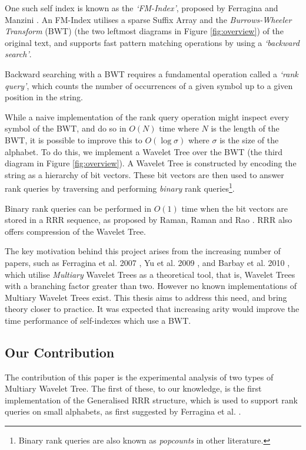 One such self index is known as the \emph{`FM-Index'}, proposed by
Ferragina and Manzini \cite{ferragina2000}. An FM-Index utilises a 
sparse Suffix Array and the \emph{Burrows-Wheeler Transform} (BWT) \cite{burrows1994} (the two leftmost 
diagrams in Figure \ref{fig:overview}) of the original text, and supports fast 
pattern matching operations by using a \emph{`backward search'}.

Backward searching with a BWT requires a fundamental operation called a 
\emph{`rank query'}, which counts the number of occurrences of a given symbol up 
to a given position in the string.

While a naive implementation of the rank query operation might inspect every 
symbol of the BWT, and do so in $O(N)$ time where $N$ is the length of the BWT, 
it is possible to improve this to $O(\log \sigma)$ where $\sigma$ is the size of 
the alphabet. To do this, we implement a Wavelet Tree \cite{grossi2003} over the BWT (the third 
diagram in Figure 
\ref{fig:overview}). A Wavelet Tree is constructed by encoding the string as a 
hierarchy of bit vectors. These bit vectors are then used to answer rank 
queries by traversing and performing \emph{binary} rank queries\footnote{ Binary rank queries are also known as \emph{popcounts} in other literature.}.

Binary rank queries can be performed in $O(1)$ time when the bit vectors are stored in
a RRR sequence, as proposed by Raman, Raman and Rao \cite{raman2007}. RRR also 
offers compression of the Wavelet Tree.

The key motivation behind this project arises from the increasing number of
papers, such as Ferragina et al. 2007
\cite{ferragina2007}, Yu et al. 2009 \cite{yu2009}, and Barbay et al. 2010
\cite{barbay2010}, which utilise \emph{Multiary} Wavelet Trees as a theoretical 
tool, that is, Wavelet Trees with a branching 
factor greater than two. However no known implementations of Multiary Wavelet 
Trees exist. This thesis aims to address this need, and bring theory closer to 
practice. It was expected that increasing arity would improve the time 
performance of self-indexes which use a BWT.


\subsection{Our Contribution}

The contribution of this paper is the experimental analysis of two types of 
Multiary Wavelet Tree. 
The first of these, to our knowledge, is the first implementation of the Generalised RRR structure, which is used to support rank queries on small 
alphabets, as first suggested by Ferragina et al. \cite{ferragina2007}.

